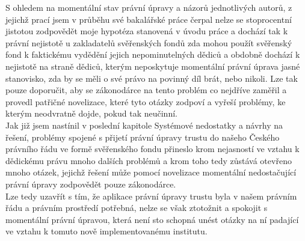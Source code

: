 \documentclass{article}
\begin{document}
S ohledem na momentální stav právní úpravy a názorů jednotlivých autorů, z jejichž prací jsem v průběhu své bakalářské práce čerpal nelze se stoprocentní jistotou zodpovědět moje hypotéza stanovená v úvodu práce a dochází tak k právní nejistotě u zakladatelů svěřenských fondů zda mohou použít svěřenský fond k faktickému vydědění jejich nepominutelných dědiců a obdobně dochází k nejistotě na straně dědiců, kterým neposkytuje momentální právní úprava jasné stanovisko, zda by se měli o své právo na povinný díl brát, nebo nikoli. Lze tak pouze doporučit, aby se zákonodárce na tento problém co nejdříve zaměřil a provedl patřičné novelizace, které tyto otázky zodpoví a vyřeší problémy, ke kterým neodvratně dojde, pokud tak neučinní.\\

Jak již jsem nastínil v poslední kapitole Systémové nedostatky a návrhy na řešení, problémy spojené s přijetí právní úpravy trustu do našeho Českého právního řádu ve formě svěřenského fondu přineslo krom nejasností ve vztahu k dědickému právu mnoho dalších problémů a krom toho tedy zůstává otevřeno mnoho otázek, jejichž řešení může pomocí novelizace momentální nedostačující právní úpravy zodpovědět pouze zákonodárce.\\

Lze tedy uzavřít s tím, že aplikace právní úpravy trustu byla v našem právním řádu a právním prostředí potřebná, nelze se však ztotožnit a spokojit s momentální právní úpravou, která není sto schopná unést otázky na ní padající ve vztahu k tomuto nově implementovanému institutu.\\
\end{document}
